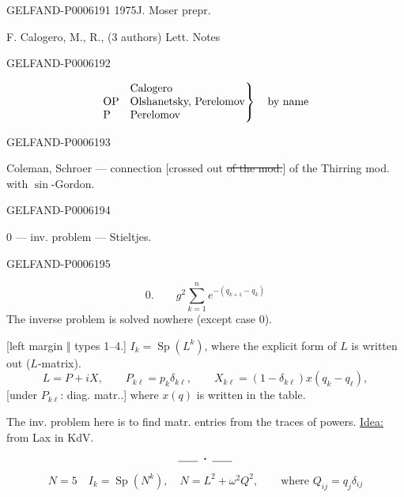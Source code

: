 \begin{GelfandAdjacentEvidence}{GELFAND-P000619}{1}
1975\qquad J. Moser prepr.

F. Calogero, M., R., (3 authors) Lett. Notes
\end{GelfandAdjacentEvidence}
\begin{GelfandAdjacentEvidence}{GELFAND-P000619}{2}

\[
\left.\begin{array}{@{}ll@{}}
&\text{Calogero}\\
\mathrm{OP}&\text{Olshanetsky, Perelomov}\\
\mathrm P&\text{Perelomov}
\end{array}\right\}\quad\text{by name}
\]
\end{GelfandAdjacentEvidence}
\begin{GelfandAdjacentEvidence}{GELFAND-P000619}{3}

Coleman, Schroer — connection [crossed out \sout{of the mod.}] of the Thirring mod. with \(\sin\)-Gordon.
\end{GelfandAdjacentEvidence}
\begin{GelfandAdjacentEvidence}{GELFAND-P000619}{4}


0 — inv. problem — Stieltjes.
\end{GelfandAdjacentEvidence}
\begin{GelfandAdjacentEvidence}{GELFAND-P000619}{5}

\[
0.\qquad g^2\sum_{k=1}^n e^{-(q_{k+1}-q_k)}
\]
The inverse problem is solved nowhere (except case 0).

[left margin \(\Vert\) types 1–4.]
 \(I_k=\operatorname{Sp}(L^k)\), where the explicit form of \(L\) is written out (\(L\)-matrix).
\[
L=P+iX,\qquad
P_{k\ell}=p_k\delta_{k\ell},\qquad X_{k\ell}=(1-\delta_{k\ell})x(q_k-q_\ell),
\]
[under \(P_{k\ell}\): diag. matr..] where \(x(q)\) is written in the table.

The inv. problem here is to find matr. entries from the traces of powers.
\underline{Idea:} from Lax in KdV.
\[\rule{1.8em}{.4pt}\;\boldsymbol{\cdot}\;\rule{1.8em}{.4pt}\]
\[
N=5\quad I_k=\operatorname{Sp}(N^k),\quad N=L^2+\omega^2Q^2,\qquad
\text{where } Q_{ij}=q_j\delta_{ij}
\]
\end{GelfandAdjacentEvidence}
